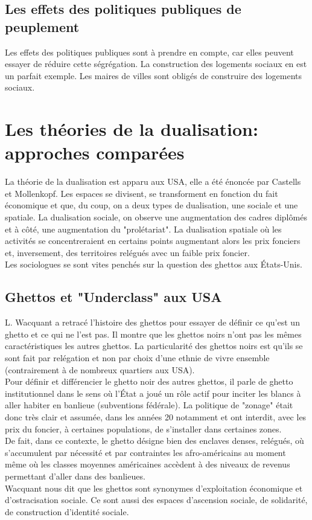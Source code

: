 \documentclass[12pt, a4paper, openany]{book}
\begin{document}
\subsection{Les effets des politiques publiques de peuplement}

Les effets des politiques publiques sont à prendre en compte, car elles peuvent essayer de réduire cette ségrégation. La construction des logements sociaux en est un parfait exemple. Les maires de villes sont obligés de construire des logements sociaux.


\section{Les théories de la dualisation: approches comparées}

La théorie de la dualisation est apparu aux USA, elle a été énoncée par Castells et Mollenkopf. Les espaces se divisent, se transforment en fonction du fait économique et que, du coup, on a deux types de dualisation, une sociale et une spatiale. La dualisation sociale, on observe une augmentation des cadres diplômés et à côté, une augmentation du "prolétariat". La dualisation spatiale où les activités se concentreraient en certains points augmentant alors les prix fonciers et, inversement, des territoires relégués avec un faible prix foncier. \\
Les sociologues se sont vites penchés sur la question des ghettos aux États-Unis.

\subsection{Ghettos et "Underclass" aux USA}

L. Wacquant a retracé l'histoire des ghettos pour essayer de définir ce qu'est un ghetto et ce qui ne l'est pas. Il montre que les ghettos noirs n'ont pas les mêmes caractéristiques les autres ghettos. La particularité des ghettos noirs est qu'ils se sont fait par relégation et non par choix d'une ethnie de vivre ensemble (contrairement à de nombreux quartiers aux USA). \\
Pour définir et différencier le ghetto noir des autres ghettos, il parle de ghetto institutionnel dans le sens où l'État a joué un rôle actif pour inciter les blancs à aller habiter en banlieue (subventions fédérale). La politique de "zonage" était donc très clair et assumée, dans les années 20 notamment et ont interdit, avec les prix du foncier, à certaines populations, de s'installer dans certaines zones. \\
De fait, dans ce contexte, le ghetto désigne bien des enclaves denses, relégués, où s'accumulent par nécessité et par contraintes les afro-américains au moment même où les classes moyennes américaines accèdent à des niveaux de revenus permettant d'aller dans des banlieues. \\
Wacquant nous dit que les ghettos sont synonymes d'exploitation économique et d'ostracisation sociale. Ce sont aussi des espaces d'ascension sociale, de solidarité, de construction d'identité sociale.
\end{document}
